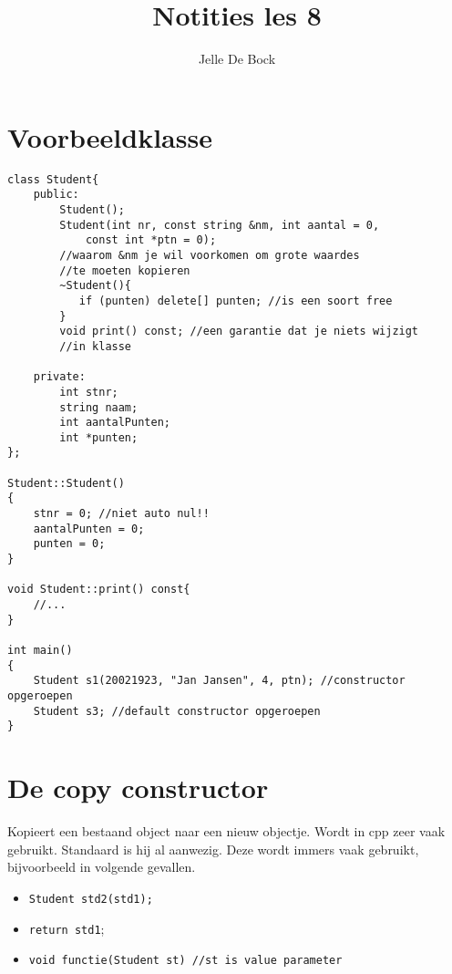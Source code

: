 \documentclass{article}
\title{Notities les 8}
\author{Jelle De Bock}
\begin{document}
\maketitle
\section{Voorbeeldklasse}
\begin{lstlisting}
class Student{
    public:
        Student();
        Student(int nr, const string &nm, int aantal = 0, 
            const int *ptn = 0);  
        //waarom &nm je wil voorkomen om grote waardes 
        //te moeten kopieren
        ~Student(){
           if (punten) delete[] punten; //is een soort free 
        }       
        void print() const; //een garantie dat je niets wijzigt 
        //in klasse

    private:
        int stnr;
        string naam;
        int aantalPunten;
        int *punten;
};

Student::Student()
{
    stnr = 0; //niet auto nul!!
    aantalPunten = 0;
    punten = 0;
}

void Student::print() const{
    //...
}

int main()
{
    Student s1(20021923, "Jan Jansen", 4, ptn); //constructor opgeroepen
    Student s3; //default constructor opgeroepen
}
\end{lstlisting}
\section{De copy constructor}
Kopieert een bestaand object naar een nieuw objectje. Wordt in cpp zeer vaak
gebruikt. Standaard is hij al aanwezig. Deze wordt immers vaak gebruikt,
bijvoorbeeld in volgende gevallen.
\begin{itemize}
    \item \texttt{Student std2(std1);}
    \item \texttt{return std1};
    \item \texttt{void functie(Student st) //st is value parameter}
\end{itemize}
\end{document}
